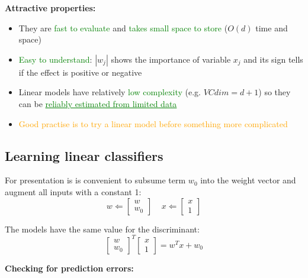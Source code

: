 \documentclass[12pt, a4paper]{article}
\begin{document}
\textbf{Attractive properties:}
\begin{itemize}
  \item They are \textcolor{Green}{fast to evaluate} and \textcolor{Green}{takes small space to store} ($O(d)$ time and space)
  \item \textcolor{Green}{Easy to understand}: $|w_j|$ shows the importance of variable $x_j$ and its sign tells if the effect is positive or negative
  \item Linear models have relatively \textcolor{Green}{low complexity} (e.g. $VCdim = d + 1$) so they can be \textcolor{Green}{\uline{reliably estimated from limited data}}
  \item \textcolor{Orange}{Good practise is to try a linear model before something more complicated}
\end{itemize}












\subsection{Learning linear classifiers}\label{learning-with-linear-classificiers}


\begin{tcolorbox}[colback=yellow!5,colframe=yellow!75!black,title={Change of representation}]
For presentation is is convenient to subsume term $w_0$ into the weight vector and augment all inputs with a constant 1:
$$
w \Leftarrow
\begin{bmatrix}
w \\
w_0
\end{bmatrix} \;\;\;\;
x \Leftarrow
\begin{bmatrix}
x \\
1
\end{bmatrix}
$$

The models have the same value for the discriminant:
$$
\begin{bmatrix}
w \\
w_0
\end{bmatrix}^T
\begin{bmatrix}
x \\
1
\end{bmatrix}
= w^T x + w_0
$$
\end{tcolorbox}


\textbf{Checking for prediction errors:}
\end{document}
